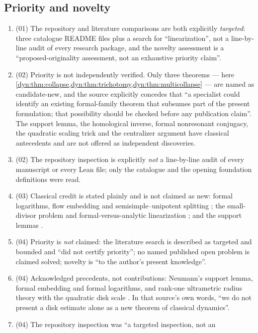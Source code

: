 \documentclass[11pt,letterpaper]{article}
\theoremstyle{definition}
\theoremstyle{remark}
\numberwithin{equation}{section}
\begin{document}
\subsection{Priority and novelty}
\begin{enumerate}[label=\textbf{N\arabic*.},leftmargin=3.2em,start=7]
\item (01) The repository and literature comparisons are both explicitly
\emph{targeted}: three catalogue README files plus a search for
``linearization'', not a line-by-line audit of every research package, and
the novelty assessment is a ``proposed-originality assessment, not an
exhaustive priority claim''.
\item (02) Priority is not independently verified. Only three theorems ---
here \cref{dyn:thm:collapse,dyn:thm:trichotomy,dyn:thm:multicollapse} ---
are named as candidate-new, and the source explicitly concedes that ``a
specialist could identify an existing formal-family theorem that subsumes
part of the present formulation; that possibility should be checked before
any publication claim''. The support lemma, the homological inverse, formal
nonresonant conjugacy, the quadratic scaling trick and the centralizer
argument have classical antecedents and are not offered as independent
discoveries.
\item (02) The repository inspection is explicitly \emph{not} a
line-by-line audit of every manuscript or every Lean file; only the
catalogue and the opening foundation definitions were read.
\item (03) Classical credit is stated plainly and is not claimed as new:
formal logarithms, flow embedding and semisimple--unipotent splitting
\cite{Ribon}; the small-divisor problem and formal-versus-analytic
linearization \cite{CarlettiMarmi,Yoccoz,BuffCheritat}; and the support
lemmas \cite{Neumann,Higman,Poonen}.
\item (04) Priority is \emph{not} claimed: the literature search is
described as targeted and bounded and ``did not certify priority''; no
named published open problem is claimed solved; novelty is ``to the
author's present knowledge''.
\item (04) Acknowledged precedents, not contributions: Neumann's support
lemma, formal embedding and formal logarithms, and rank-one ultrametric
radius theory with the quadratic disk scale \cite{Lindahl}. In that
source's own words, ``we do not present a disk estimate alone as a new
theorem of classical dynamics''.
\item (04) The repository inspection was ``a targeted inspection, not an

\end{enumerate}
\end{document}
